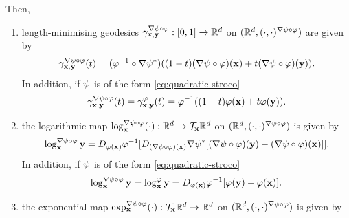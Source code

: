 \begin{proposition}
        Then,
        \begin{enumerate}[label=(\roman*)]
            \item length-minimising geodesics $\gamma^{\nabla \psi \circ \varphi}_{\mathbf{x}, \mathbf{y}}:[0,1] \to \mathbb{R}^d$ on $(\mathbb{R}^d, (\cdot,\cdot)^{\nabla \psi \circ \varphi})$ are given by 
            \begin{equation}
                \gamma^{\nabla \psi \circ \varphi}_{\mathbf{x}, \mathbf{y}}(t)= (\varphi^{-1} \circ\nabla \psi^*) ((1 - t)(\nabla \psi \circ \varphi)(\mathbf{x}) + t (\nabla \psi \circ \varphi)(\mathbf{y})).
                \label{eq:thm-geodesic-remetrised}
            \end{equation}
            In addition, if $\psi$ is of the form \ref{eq:quadratic-stroco}
            \begin{equation}
                \gamma^{\nabla \psi \circ \varphi}_{\mathbf{x}, \mathbf{y}}(t) = \gamma^\varphi_{\mathbf{x}, \mathbf{y}}(t) = \varphi^{-1}((1 - t)\varphi(\mathbf{x}) + t \varphi(\mathbf{y})).
                \label{eq:thm-geodesic-remetrised-special-psi}
            \end{equation}
            \item the logarithmic map $\log^{\nabla \psi \circ \varphi}_{\mathbf{x}} (\cdot):\mathbb{R}^d \to \mathcal{T}_{\mathbf{x}} \mathbb{R}^d$  on $(\mathbb{R}^d, (\cdot,\cdot)^{\nabla \psi \circ \varphi})$ is given by 
            \begin{equation}
                \log^{\nabla \psi \circ \varphi}_{\mathbf{x}} \mathbf{y} =  D_{\varphi(\mathbf{x})}\varphi^{-1}[D_{(\nabla \psi \circ \varphi)(\mathbf{x})}\nabla \psi^*[(\nabla \psi \circ \varphi)(\mathbf{y}) - (\nabla \psi \circ \varphi)(\mathbf{x})]].
                \label{eq:thm-log-remetrised}
            \end{equation}
            In addition, if $\psi$ is of the form \ref{eq:quadratic-stroco}
            \begin{equation}
                \log^{\nabla \psi \circ \varphi}_{\mathbf{x}} \mathbf{y} = \log^\varphi_{\mathbf{x}} \mathbf{y} = D_{\varphi(\mathbf{x})}\varphi^{-1}[\varphi(\mathbf{y}) - \varphi(\mathbf{x})].
                \label{eq:thm-log-remetrised-special-psi}
            \end{equation}
            \item the exponential map $\exp^{\nabla \psi \circ \varphi}_{\mathbf{x}} (\cdot):\mathcal{T}_{\mathbf{x}} \mathbb{R}^d \to \mathbb{R}^d$ on $(\mathbb{R}^d, (\cdot,\cdot)^{\nabla \psi \circ \varphi})$ is given by 

\end{enumerate}
\end{proposition}

